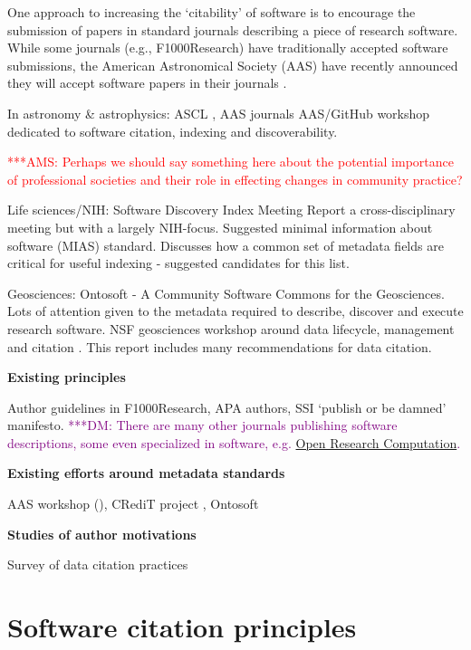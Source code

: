\documentclass[11pt, oneside]{amsart}
\newcommand{\asnote}[1]{ {\textcolor{red} { ***AMS: #1 }}}
\newcommand{\dmnote}[1]{ {\textcolor{purple} { ***DM: #1 }}} %
\begin{document}
One approach to increasing the `citability' of software is to encourage the
submission of papers in standard journals describing a piece of research
software. While some journals (e.g., F1000Research) have traditionally accepted
software submissions, the American Astronomical Society (AAS) have recently
announced they will accept software papers in their journals
\cite{aas-sofware-papers}.

In astronomy \& astrophysics: ASCL \cite{ascl}, AAS journals  AAS/GitHub
workshop \cite{aas-software-index} dedicated to software citation, indexing and discoverability.

\asnote{Perhaps we should say something here about the potential importance of professional societies and their role in effecting changes in community practice?}

Life sciences/NIH: Software Discovery Index Meeting Report \cite{software-discovery-index} a cross-disciplinary meeting
but with a largely NIH-focus. Suggested minimal information about software (MIAS) standard. Discusses how a common set of metadata
fields are critical for useful indexing - suggested candidates for this list.

Geosciences: Ontosoft \cite{ontosoft} - A Community Software Commons for the Geosciences. Lots of attention given to the metadata
required to describe, discover and execute research software. NSF geosciences workshop around data lifecycle, management and citation \cite{nsf-geo-data}. This report includes many recommendations for data citation.

\textbf{Existing principles}

Author guidelines in F1000Research, APA authors, SSI `publish or be damned' \cite{ssi-publish-or-be-damned} manifesto. \dmnote{There are many other journals publishing software descriptions, some even specialized in software, e.g. \href{http://www.openresearchcomputation.com}{Open Research Computation}.}

\textbf{Existing efforts around metadata standards}

AAS workshop (\cite{aas-software-index}), CRediT project \cite{casrai-credit}, Ontosoft \cite{ontosoft}

\textbf{Studies of author motivations}

Survey of data citation practices \cite{Kratz_2015}

\section{Software citation principles}
\label{sec:principles}
\end{document}
